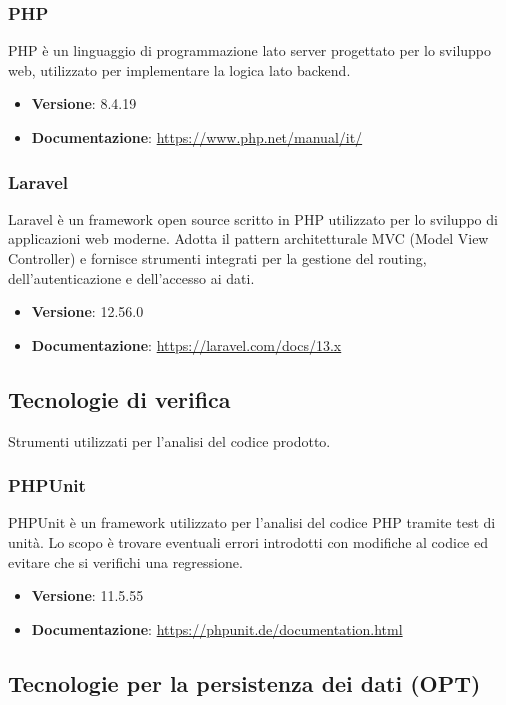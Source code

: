 \documentclass[a4paper,10pt]{article}
\begin{document}
\subsubsection{PHP}
PHP è un linguaggio di programmazione lato server progettato per lo sviluppo web, utilizzato per implementare la logica lato backend.
\begin{itemize}
    \item \textbf{Versione}: 8.4.19
    \item \textbf{Documentazione}: \url{https://www.php.net/manual/it/}
\end{itemize}

\subsubsection{Laravel}
Laravel è un framework open source scritto in PHP utilizzato per lo sviluppo di applicazioni web moderne. Adotta il pattern architetturale MVC (Model View Controller) e fornisce strumenti integrati per la gestione del routing, dell’autenticazione e dell’accesso ai dati.
\begin{itemize}
    \item \textbf{Versione}: 12.56.0
    \item \textbf{Documentazione}: \url{https://laravel.com/docs/13.x}
\end{itemize}


\subsection{Tecnologie di verifica}
Strumenti utilizzati per l'analisi del codice prodotto.

\subsubsection{PHPUnit}
PHPUnit è un framework utilizzato per l'analisi del codice PHP tramite test di unità. Lo scopo è trovare eventuali errori introdotti con modifiche al codice ed evitare che si verifichi una regressione.
\begin{itemize}
    \item \textbf{Versione}: 11.5.55
    \item \textbf{Documentazione}: \url{https://phpunit.de/documentation.html}
\end{itemize}

\subsection{Tecnologie per la persistenza dei dati (OPT)}
\end{document}
